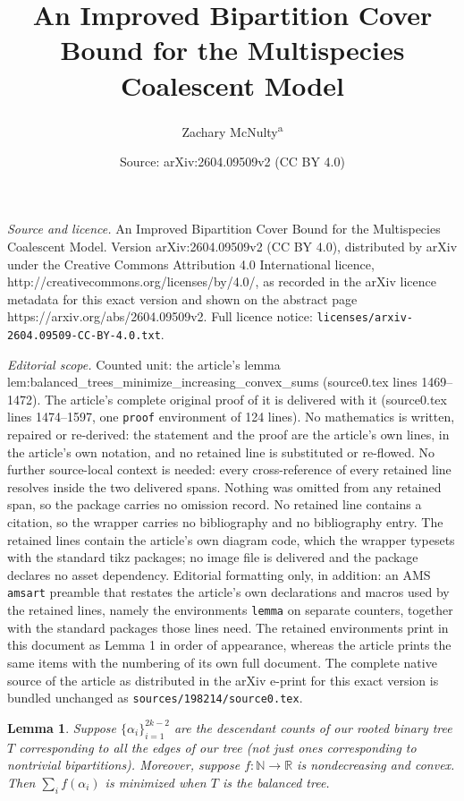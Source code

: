 \documentclass[10pt,a4paper]{amsart}
\title{An Improved Bipartition Cover Bound for the Multispecies Coalescent Model}
\author{Zachary McNulty\textsuperscript{a}}
\date{Source: arXiv:2604.09509v2 (CC BY 4.0)}
\newtheorem{lemma}{Lemma}
\newcommand{\N}{\mathbb{N}}
\newcommand{\R}{\mathbb{R}}
\begin{document}
\maketitle

\noindent\emph{Source and licence.} An Improved Bipartition Cover Bound for the Multispecies Coalescent Model. Version arXiv:2604.09509v2 (CC BY 4.0), distributed by arXiv under the Creative Commons Attribution 4.0 International licence, http://creativecommons.org/licenses/by/4.0/, as recorded in the arXiv licence metadata for this exact version and shown on the abstract page https://arxiv.org/abs/2604.09509v2. Full licence notice: \texttt{licenses/arxiv-2604.09509-CC-BY-4.0.txt}.\par\smallskip

\noindent\textit{Editorial scope.} Counted unit: the article's lemma lem:balanced\_trees\_minimize\_increasing\_convex\_sums (source0.tex lines 1469--1472). The article's complete original proof of it is delivered with it (source0.tex lines 1474--1597, one \texttt{proof} environment of 124 lines). No mathematics is written, repaired or re-derived: the statement and the proof are the article's own lines, in the article's own notation, and no retained line is substituted or re-flowed.  No further source-local context is needed: every cross-reference of every retained line resolves inside the two delivered spans.  Nothing was omitted from any retained span, so the package carries no omission record.  No retained line contains a citation, so the wrapper carries no bibliography and no bibliography entry.  The retained lines contain the article's own diagram code, which the wrapper typesets with the standard tikz packages; no image file is delivered and the package declares no asset dependency.  Editorial formatting only, in addition: an AMS \texttt{amsart} preamble that restates the article's own declarations and macros used by the retained lines, namely the environments \texttt{lemma} on separate counters, together with the standard packages those lines need.  The retained environments print in this document as Lemma 1 in order of appearance, whereas the article prints the same items with the numbering of its own full document.  The complete native source of the article as distributed in the arXiv e-print for this exact version is bundled unchanged as \texttt{sources/198214/source0.tex}.
\begin{lemma}
 Suppose $\{\alpha_{i}\}_{i=1}^{2k-2}$ are the descendant counts of our rooted binary tree $T$ corresponding to \textit{all} the edges of our tree (not just ones corresponding to nontrivial bipartitions). Moreover, suppose $f: \N \to \R$ is nondecreasing and convex. Then $\sum_i f(\alpha_{i})$ is minimized when $T$ is the balanced tree.
 \label{lem:balanced_trees_minimize_increasing_convex_sums}
\end{lemma}
\end{document}

